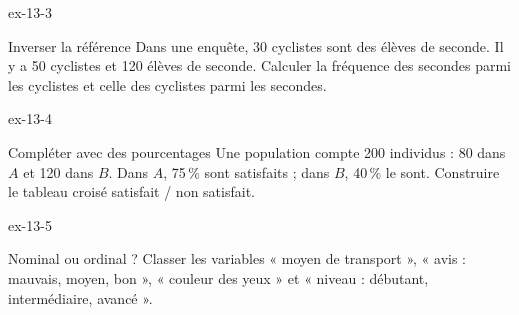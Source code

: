 \begin{blocLivre}{ex-13-3}
\begin{exercice}[1]{Inverser la référence}
Dans une enquête, 30 cyclistes sont des élèves de seconde. Il y a 50 cyclistes et 120 élèves de seconde. Calculer la fréquence des secondes parmi les cyclistes et celle des cyclistes parmi les secondes.
\end{exercice}
\end{blocLivre}
\begin{blocLivre}{ex-13-4}
\begin{exercice}[1]{Compléter avec des pourcentages}
Une population compte 200 individus : 80 dans $A$ et 120 dans $B$. Dans $A$, 75\,\% sont satisfaits ; dans $B$, 40\,\% le sont. Construire le tableau croisé satisfait / non satisfait.
\end{exercice}
\end{blocLivre}
\begin{blocLivre}{ex-13-5}
\begin{exercice}[1]{Nominal ou ordinal ?}
Classer les variables « moyen de transport », « avis : mauvais, moyen, bon », « couleur des yeux » et « niveau : débutant, intermédiaire, avancé ».
\end{exercice}
\end{blocLivre}

